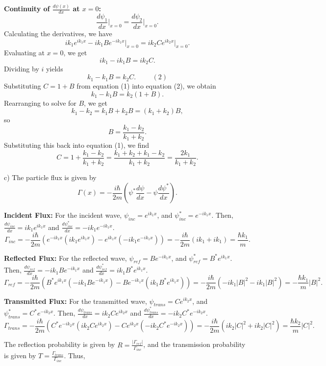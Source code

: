 \documentclass{article}
\begin{document}
\noindent \textbf{Continuity of $\frac{d\psi(x)}{dx}$ at $x=0$:}
\[
\frac{d\psi_1}{dx}\bigg|_{x=0} = \frac{d\psi_2}{dx}\bigg|_{x=0}.
\]
\noindent Calculating the derivatives, we have
\[
ik_1e^{ik_1x} - ik_1Be^{-ik_1x}\bigg|_{x=0} = ik_2Ce^{ik_2x}\bigg|_{x=0}.
\]
\noindent Evaluating at $x=0$, we get
\[
ik_1 - ik_1B = ik_2C.
\]
\noindent Dividing by $i$ yields
\[
k_1 - k_1B = k_2C. \hspace{1cm} (2)
\]
\noindent Substituting $C = 1 + B$ from equation (1) into equation (2), we obtain
\[
k_1 - k_1B = k_2(1 + B).
\]
\noindent Rearranging to solve for $B$, we get
\[
k_1 - k_2 = k_1B + k_2B = (k_1 + k_2)B,
\]
\noindent so
\[
B = \frac{k_1 - k_2}{k_1 + k_2}.
\]
\noindent Substituting this back into equation (1), we find
\[
C = 1 + \frac{k_1 - k_2}{k_1 + k_2} = \frac{k_1 + k_2 + k_1 - k_2}{k_1 + k_2} = \frac{2k_1}{k_1 + k_2}.
\]

\noindent c) The particle flux is given by
\[
\Gamma(x) = -\frac{i\hbar}{2m} \left( \psi^* \frac{d\psi}{dx} - \psi \frac{d\psi^*}{dx} \right).
\]

\noindent \textbf{Incident Flux:} For the incident wave, $\psi_{inc} = e^{ik_1x}$, and $\psi_{inc}^* = e^{-ik_1x}$. Then, $\frac{d\psi_{inc}}{dx} = ik_1e^{ik_1x}$ and $\frac{d\psi_{inc}^*}{dx} = -ik_1e^{-ik_1x}$.
\[
\Gamma_{inc} = -\frac{i\hbar}{2m} \left( e^{-ik_1x}(ik_1e^{ik_1x}) - e^{ik_1x}(-ik_1e^{-ik_1x}) \right) = -\frac{i\hbar}{2m} \left( ik_1 + ik_1 \right) = \frac{\hbar k_1}{m}.
\]

\noindent \textbf{Reflected Flux:} For the reflected wave, $\psi_{ref} = Be^{-ik_1x}$, and $\psi_{ref}^* = B^*e^{ik_1x}$. Then, $\frac{d\psi_{ref}}{dx} = -ik_1Be^{-ik_1x}$ and $\frac{d\psi_{ref}^*}{dx} = ik_1B^*e^{ik_1x}$.
\[
\Gamma_{ref} = -\frac{i\hbar}{2m} \left( B^*e^{ik_1x}(-ik_1Be^{-ik_1x}) - Be^{-ik_1x}(ik_1B^*e^{ik_1x}) \right) = -\frac{i\hbar}{2m}(-ik_1|B|^2 - ik_1|B|^2) = -\frac{\hbar k_1}{m}|B|^2.
\]

\noindent \textbf{Transmitted Flux:} For the transmitted wave, $\psi_{trans} = Ce^{ik_2x}$, and $\psi_{trans}^* = C^*e^{-ik_2x}$. Then, $\frac{d\psi_{trans}}{dx} = ik_2Ce^{ik_2x}$ and $\frac{d\psi_{trans}^*}{dx} = -ik_2C^*e^{-ik_2x}$.
\[
\Gamma_{trans} = -\frac{i\hbar}{2m} \left( C^*e^{-ik_2x}(ik_2Ce^{ik_2x}) - Ce^{ik_2x}(-ik_2C^*e^{-ik_2x}) \right) = -\frac{i\hbar}{2m} \left( ik_2|C|^2 + ik_2|C|^2 \right) = \frac{\hbar k_2}{m}|C|^2.
\]

\noindent The reflection probability is given by $R = \frac{|\Gamma_{ref}|}{\Gamma_{inc}}$, and the transmission probability is given by $T = \frac{\Gamma_{trans}}{\Gamma_{inc}}$. Thus,
\end{document}
